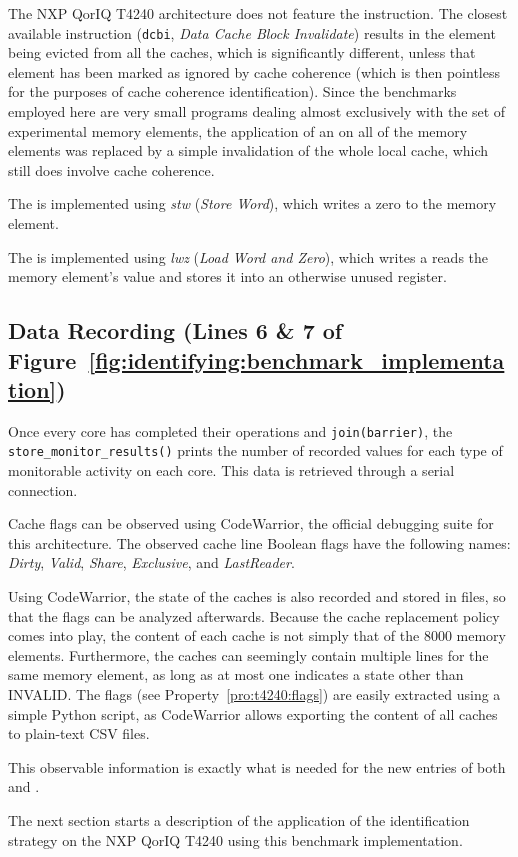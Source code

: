 The NXP QorIQ T4240 architecture does not feature the \evictinstr{}
instruction. The closest available instruction (\texttt{dcbi}, \textit{Data
Cache Block Invalidate}) results in the element being evicted from all the
caches, which is significantly different, unless that element has been marked as
ignored by cache coherence (which is then pointless for the purposes of cache
coherence identification). Since the benchmarks employed here are very small
programs dealing almost exclusively with the set of experimental memory
elements, the application of an  \evictinstr{} on all of the memory elements was
replaced by a simple invalidation of the whole local cache, which still does
involve cache coherence.

The \storeinstr{} is implemented using \textit{stw} (\textit{Store Word}), which
writes a zero to the memory element.

The \loadinstr{} is implemented using \textit{lwz} (\textit{Load Word and
Zero}), which writes a reads the memory element's value and stores it into an
otherwise unused register.

\subsection{Data Recording (Lines 6 \& 7 of
Figure~\ref{fig:identifying:benchmark_implementation})}
\label{sec:identifying:data_recording}
Once every core has completed their operations and \lstinline!join(barrier)!,
the \lstinline!store_monitor_results()! prints the number of recorded values
for each type of monitorable activity on each core. This data is retrieved
through a serial connection.

\begin{property}
\label{pro:t4240:flags}
Cache flags can be observed using CodeWarrior, the official debugging suite for
this architecture. The observed cache line Boolean flags have the following
names: \textit{Dirty}, \textit{Valid}, \textit{Share}, \textit{Exclusive}, and
\textit{LastReader}.
\end{property}

Using CodeWarrior, the state of the caches is also recorded and stored in files,
so that the flags can be analyzed afterwards. Because the cache replacement
policy comes into play, the content of each cache is not simply that of the 8000
memory elements. Furthermore, the caches can seemingly contain multiple lines
for the same memory element, as long as at most one indicates a state other than
INVALID. The flags (see Property~\ref{pro:t4240:flags}) are easily extracted
using a simple Python script, as CodeWarrior allows exporting the content of all
caches to plain-text CSV files.

This observable information is exactly what is needed for the new entries of
both \obssystemstate{} and \archmonitorval{}.

The next section starts a description of the application of the identification
strategy on the NXP QorIQ T4240 using this benchmark implementation.

\stopallthesefloats
